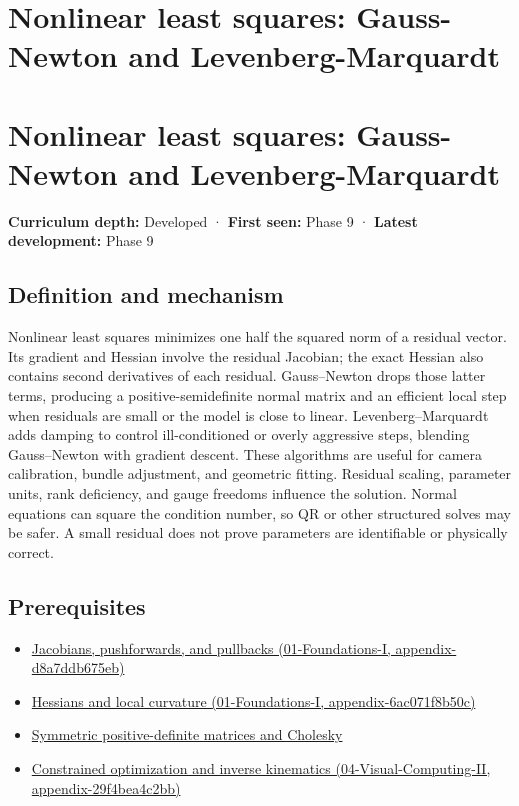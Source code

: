 \hypertarget{appendix-2c2df8345991}{}
\section*{Nonlinear least squares: Gauss-Newton and Levenberg-Marquardt}
\section{Nonlinear least squares: Gauss-Newton and Levenberg-Marquardt}\label{appendix-2c2df8345991-nonlinear-least-squares-gauss-newton-and-levenberg-marquardt}

\textbf{Curriculum depth:} Developed · \textbf{First seen:} Phase 9 · \textbf{Latest development:} Phase 9

\subsection{Definition and mechanism}\label{appendix-2c2df8345991-definition-and-mechanism}

Nonlinear least squares minimizes one half the squared norm of a residual vector. Its gradient and Hessian involve the residual Jacobian; the exact Hessian also contains second derivatives of each residual. Gauss--Newton drops those latter terms, producing a positive-semidefinite normal matrix and an efficient local step when residuals are small or the model is close to linear. Levenberg--Marquardt adds damping to control ill-conditioned or overly aggressive steps, blending Gauss--Newton with gradient descent. These algorithms are useful for camera calibration, bundle adjustment, and geometric fitting. Residual scaling, parameter units, rank deficiency, and gauge freedoms influence the solution. Normal equations can square the condition number, so QR or other structured solves may be safer. A small residual does not prove parameters are identifiable or physically correct.

\subsection{Prerequisites}\label{appendix-2c2df8345991-prerequisites}

\begin{itemize}
\tightlist
\item
  \href{../01-Foundations-I/main.pdf\#nameddest=appendix-d8a7ddb675eb}{Jacobians, pushforwards, and pullbacks (01-Foundations-I, appendix-d8a7ddb675eb)}
\item
  \href{../01-Foundations-I/main.pdf\#nameddest=appendix-6ac071f8b50c}{Hessians and local curvature (01-Foundations-I, appendix-6ac071f8b50c)}
\item
  \hyperref[appendix-50d2ea3c9b26]{Symmetric positive-definite matrices and Cholesky}
\item
  \href{../04-Visual-Computing-II/main.pdf\#nameddest=appendix-29f4bea4c2bb}{Constrained optimization and inverse kinematics (04-Visual-Computing-II, appendix-29f4bea4c2bb)}
\end{itemize}

